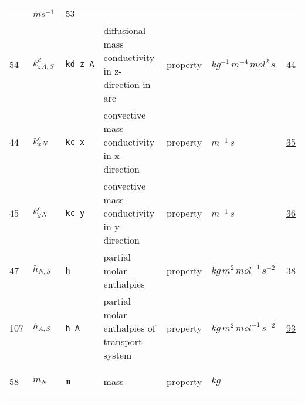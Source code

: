 \begin{longtable}{|p{1cm}|p{2.5cm}|p{4.5cm}|p{8cm}|p{3.0cm}|p{3cm}|p{1cm}|}
             & $ m s^{-1} \, $
             &                 \hyperlink{"e:53"}{ 53 }
                 \\
            54
             & \hypertarget{"v:54"}{ $ {{k^d_z}}{_{A, S}} $}
             & \verb|kd_z_A|
             & diffusional mass conductivity in z-direction in arc
             & \begin{lay}property \end{lay}
             & $ kg^{-1} \,m^{-4} \,mol^{2} \,s \, $
             &                 \hyperlink{"e:44"}{ 44 }
                 \\
            44
             & \hypertarget{"v:44"}{ $ {{k^c_x}}{_{N}} $}
             & \verb|kc_x|
             &  convective mass conductivity in x-direction
             & \begin{lay}property \end{lay}
             & $ m^{-1} \,s \, $
             &                 \hyperlink{"e:35"}{ 35 }
                 \\
            45
             & \hypertarget{"v:45"}{ $ {{k^c_y}}{_{N}} $}
             & \verb|kc_y|
             &  convective mass conductivity in y-direction
             & \begin{lay}property \end{lay}
             & $ m^{-1} \,s \, $
             &                 \hyperlink{"e:36"}{ 36 }
                 \\
            47
             & \hypertarget{"v:47"}{ $ {h}{_{N, S}} $}
             & \verb|h|
             & partial molar enthalpies
             & \begin{lay}property \end{lay}
             & $ kg \,m^{2} \,mol^{-1} \,s^{-2} \, $
             &                 \hyperlink{"e:38"}{ 38 }
                 \\
            107
             & \hypertarget{"v:107"}{ $ {h}{_{A, S}} $}
             & \verb|h_A|
             & partial molar enthalpies of transport system
             & \begin{lay}property \end{lay}
             & $ kg \,m^{2} \,mol^{-1} \,s^{-2} \, $
             &                 \hyperlink{"e:93"}{ 93 }
                 \\
            58
             & \hypertarget{"v:58"}{ $ {m}{_{N}} $}
             & \verb|m|
             & mass
             & \begin{lay}property \end{lay}
             & $ kg \, $

\end{longtable}
